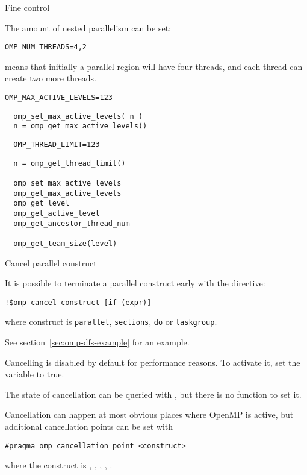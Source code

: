  {Fine control}

The amount of nested parallelism can be set:
\begin{verbatim}
OMP_NUM_THREADS=4,2
\end{verbatim}
means that initially a parallel region will have four threads, and
each thread can create two more threads.

\begin{verbatim}
OMP_MAX_ACTIVE_LEVELS=123
\end{verbatim}

\begin{lstlisting}
  omp_set_max_active_levels( n )
  n = omp_get_max_active_levels()
\end{lstlisting}

\begin{verbatim}
  OMP_THREAD_LIMIT=123
\end{verbatim}

\begin{lstlisting}
  n = omp_get_thread_limit()

  omp_set_max_active_levels
  omp_get_max_active_levels
  omp_get_level
  omp_get_active_level
  omp_get_ancestor_thread_num

  omp_get_team_size(level)
\end{lstlisting}


 {Cancel parallel construct}
\label{sec:omp-cancel}

It is possible to terminate a parallel construct early
with the  directive:
\begin{lstlisting}
!$omp cancel construct [if (expr)]
\end{lstlisting}
where construct is
\lstinline{parallel},
\lstinline{sections},
\lstinline{do}
or
\lstinline{taskgroup}.

See section~\ref{sec:omp-dfs-example} for an example.

Cancelling is disabled by default for performance reasons.
To activate it, set the  variable to true.

The state of cancellation can be queried with ,
but there is no function to set it.

Cancellation can happen at most obvious places where OpenMP is active,
but additional cancellation points can be set with 
\begin{lstlisting}
#pragma omp cancellation point <construct>
\end{lstlisting}
where the construct is , ,
, , .

